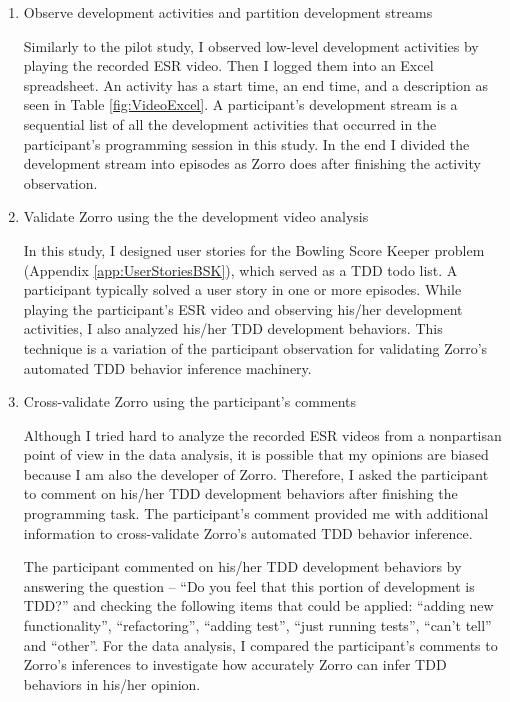 \begin{enumerate}
\item Observe development activities and partition development streams

Similarly to the pilot study, I observed low-level development activities
by playing the recorded ESR video. Then I logged them into an Excel 
spreadsheet. An activity has a start time, an end time, and a description 
as seen in Table \ref{fig:VideoExcel}. A participant's development stream 
is a sequential list of all the development activities that occurred in the 
participant's programming session in this study. In the end I divided the 
development stream into episodes as Zorro does after finishing the activity 
observation.

\item Validate Zorro using the the development video analysis

In this study, I designed user stories for the Bowling Score Keeper
problem (Appendix \ref{app:UserStoriesBSK}), which served as a TDD todo 
list. A participant typically solved a user story in one or more
episodes. While playing the participant's ESR video and observing his/her 
development activities, I also analyzed his/her TDD development behaviors. 
This technique is a variation of the participant observation for validating 
Zorro's automated TDD behavior inference machinery.

\item Cross-validate Zorro using the participant's comments

Although I tried hard to analyze the recorded ESR videos from a
nonpartisan point of view in the data analysis, it is possible that my
opinions are biased because I am also the developer of
Zorro. Therefore, I asked the participant to comment on his/her TDD
development behaviors after finishing the programming task. The
participant's comment provided me with additional information to
cross-validate Zorro's automated TDD behavior inference.

The participant commented on his/her TDD development behaviors by
answering the question -- ``Do you feel that this portion of
development is TDD?''  and checking the following items that could be
applied: ``adding new functionality'', ``refactoring'', ``adding
test'', ``just running tests'', ``can't tell'' and ``other''. For the
data analysis, I compared the participant's comments to Zorro's
inferences to investigate how accurately Zorro can infer TDD behaviors
in his/her opinion.


\end{enumerate}
